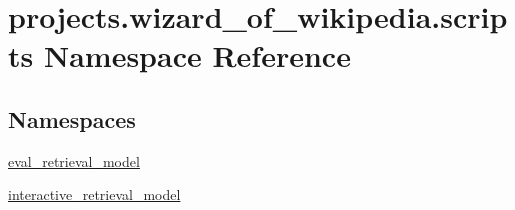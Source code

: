 \hypertarget{namespaceprojects_1_1wizard__of__wikipedia_1_1scripts}{}\section{projects.\+wizard\+\_\+of\+\_\+wikipedia.\+scripts Namespace Reference}
\label{namespaceprojects_1_1wizard__of__wikipedia_1_1scripts}
\subsection*{Namespaces}
\begin{DoxyCompactItemize}
\item 
 \hyperlink{namespaceprojects_1_1wizard__of__wikipedia_1_1scripts_1_1eval__retrieval__model}{eval\+\_\+retrieval\+\_\+model}
\item 
 \hyperlink{namespaceprojects_1_1wizard__of__wikipedia_1_1scripts_1_1interactive__retrieval__model}{interactive\+\_\+retrieval\+\_\+model}
\end{DoxyCompactItemize}
